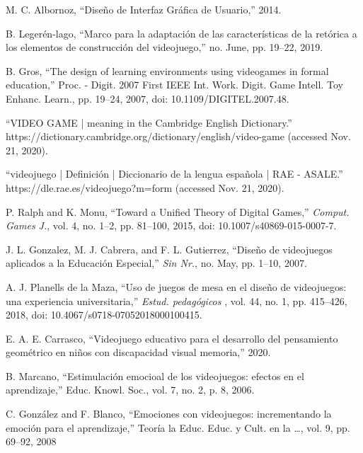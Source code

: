 \documentclass[conference, letterpaper]{IEEEtran}
\begin{document}
\begin{thebibliography}{1}
		
M. C. Albornoz, “Diseño de Interfaz Gráfica de Usuario,” 2014.

B. Legerén-lago, “Marco para la adaptación de las características de la
	retórica a los elementos de construcción del videojuego,” no. June, pp.
	19–22, 2019.
	
B. Gros, “The design of learning environments using videogames in
	formal education,” Proc. - Digit. 2007 First IEEE Int. Work. Digit.
	Game Intell. Toy Enhanc. Learn., pp. 19–24, 2007, doi:
	10.1109/DIGITEL.2007.48.
	
“VIDEO GAME | meaning in the Cambridge English Dictionary.”
https://dictionary.cambridge.org/dictionary/english/video-game
(accessed Nov. 21, 2020).

“videojuego | Definición | Diccionario de la lengua española | RAE -
ASALE.” https://dle.rae.es/videojuego?m=form (accessed Nov. 21,
2020).

P. Ralph and K. Monu, “Toward a Unified Theory of Digital Games,”\emph{
Comput. Games J.}, vol. 4, no. 1–2, pp. 81–100, 2015, doi:
10.1007/s40869-015-0007-7.

J. L. Gonzalez, M. J. Cabrera, and F. L. Gutierrez, “Diseño de
videojuegos aplicados a la Educación Especial,” \emph{Sin Nr.}, no. May, pp.
1–10, 2007.

A. J. Planells de la Maza, “Uso de juegos de mesa en el diseño de
videojuegos: una experiencia universitaria,” \emph{Estud. pedagógicos }, vol. 44,
no. 1, pp. 415–426, 2018, doi: 10.4067/s0718-07052018000100415.

E. A. E. Carrasco, “Videojuego educativo para el desarrollo del
pensamiento geométrico en niños con discapacidad visual memoria,”
2020.

B. Marcano, “Estimulación emocioal de los videojuegos: efectos en el
aprendizaje,” Educ. Knowl. Soc., vol. 7, no. 2, p. 8, 2006.

C. González and F. Blanco, “Emociones con videojuegos:
incrementando la emoción para el aprendizaje,” Teoría la Educ. Educ. y
Cult. en la …, vol. 9, pp. 69–92, 2008
\end{thebibliography}
\end{document}
